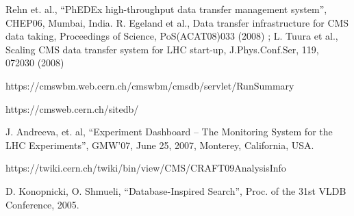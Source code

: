 \documentclass[a4paper]{jpconf}
\begin{document}
\begin{thebibliography}{9}
Rehn et. al.,
``PhEDEx high-throughput data transfer management system'', CHEP06, Mumbai, India.
R. Egeland et al., Data transfer infrastructure for CMS data taking, Proceedings of Science,
PoS(ACAT08)033 (2008) ;
L. Tuura et al., Scaling CMS data transfer system for LHC start-up, J.Phys.Conf.Ser, 119, 072030 (2008)

https://cmswbm.web.cern.ch/cmswbm/cmsdb/servlet/RunSummary

https://cmsweb.cern.ch/sitedb/




J. Andreeva, et. al,
``Experiment Dashboard – The Monitoring System for the LHC Experiments'',
GMW’07, June 25, 2007, Monterey, California, USA.

https://twiki.cern.ch/twiki/bin/view/CMS/CRAFT09AnalysisInfo

D. Konopnicki, O. Shmueli,
``Database-Inspired Search'', 
Proc. of the 31st VLDB Conference, 2005.
\end{thebibliography}
\end{document}
